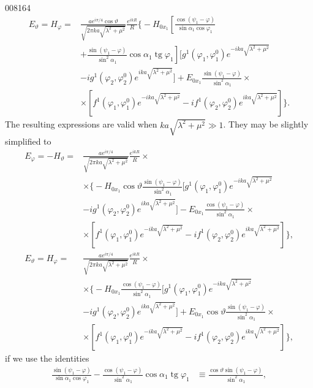 \begin{scanpage}{0081}{64}
\[
\begin{aligned}
E_\vartheta=H_\varphi={}&\frac{ae^{i\pi/4}\cos\vartheta}{\sqrt{2\pi ka\sqrt{\lambda^2+\mu^2}}}\frac{e^{ikR}}R\biggl\{-H_{0x_1}\left[\frac{\cos(\psi_1-\varphi)}{\sin\alpha_1\cos\varphi_1}\right.\\
&\left.+\frac{\sin(\psi_1-\varphi)}{\sin^2\alpha_1}\cos\alpha_1\operatorname{tg}\varphi_1\right][g^1(\varphi_1,\varphi_1^0)e^{-ika\sqrt{\lambda^2+\mu^2}}\\
&-ig^1(\varphi_2,\varphi_2^0)e^{ika\sqrt{\lambda^2+\mu^2}}]+E_{0x_1}\frac{\sin(\psi_1-\varphi)}{\sin^2\alpha_1}\times\\
&\times[f^1(\varphi_1,\varphi_1^0)e^{-ika\sqrt{\lambda^2+\mu^2}}-if^1(\varphi_2,\varphi_2^0)e^{ika\sqrt{\lambda^2+\mu^2}}]\biggr\}.
\end{aligned}\tag{11.31}
\]
The resulting expressions are valid when $ka\sqrt{\lambda^2+\mu^2}\gg1$. They may be slightly simplified to
\[
\begin{aligned}
E_\varphi=-H_\vartheta={}&\frac{ae^{i\pi/4}}{\sqrt{2\pi ka\sqrt{\lambda^2+\mu^2}}}\frac{e^{ikR}}R\times\\
&\times\biggl\{-H_{0x_1}\cos\vartheta\frac{\sin(\psi_1-\varphi)}{\sin^2\alpha_1}[g^1(\varphi_1,\varphi_1^0)e^{-ika\sqrt{\lambda^2+\mu^2}}\\
&-ig^1(\varphi_2,\varphi_2^0)e^{ika\sqrt{\lambda^2+\mu^2}}]-E_{0x_1}\frac{\cos(\psi_1-\varphi)}{\sin^2\alpha_1}\times\\
&\times[f^1(\varphi_1,\varphi_1^0)e^{-ika\sqrt{\lambda^2+\mu^2}}-if^1(\varphi_2,\varphi_2^0)e^{ika\sqrt{\lambda^2+\mu^2}}]\biggr\},\\
E_\vartheta=H_\varphi={}&\frac{ae^{i\pi/4}}{\sqrt{2\pi ka\sqrt{\lambda^2+\mu^2}}}\frac{e^{ikR}}R\times\\
&\times\biggl\{-H_{0x_1}\frac{\cos(\psi_1-\varphi)}{\sin^2\alpha_1}[g^1(\varphi_1,\varphi_1^0)e^{-ika\sqrt{\lambda^2+\mu^2}}\\
&-ig^1(\varphi_2,\varphi_2^0)e^{ika\sqrt{\lambda^2+\mu^2}}]+E_{0x_1}\cos\vartheta\frac{\sin(\psi_1-\varphi)}{\sin^2\alpha_1}\times\\
&\times[f^1(\varphi_1,\varphi_1^0)e^{-ika\sqrt{\lambda^2+\mu^2}}-if^1(\varphi_2,\varphi_2^0)e^{ika\sqrt{\lambda^2+\mu^2}}]\biggr\},
\end{aligned}\tag{11.32}
\]
if we use the identities
\[
\left.\begin{aligned}
\frac{\sin(\psi_1-\varphi)}{\sin\alpha_1\cos\varphi_1}-\frac{\cos(\psi_1-\varphi)}{\sin^2\alpha_1}\cos\alpha_1\operatorname{tg}\varphi_1&\equiv\frac{\cos\vartheta\sin(\psi_1-\varphi)}{\sin^2\alpha_1},\\

\end{aligned}\]
\end{scanpage}
